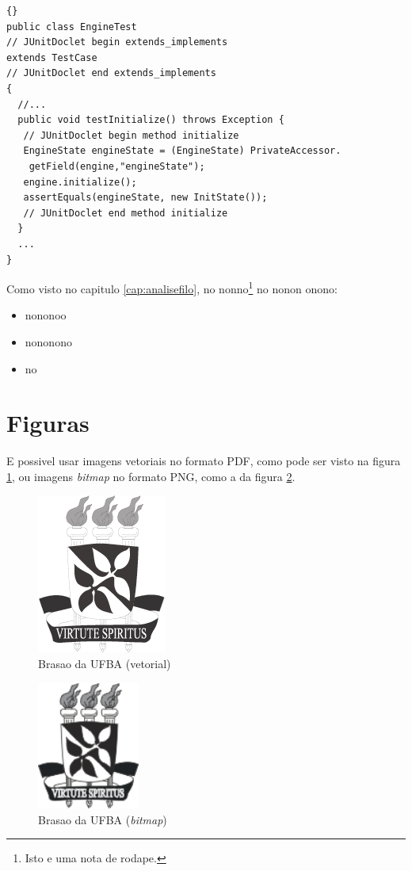 \lstset{language=java}
\lstset{commentstyle=\textit}
\begin{lstlisting}[frame=trbl, caption=Classe Factory2D,label=lst:testjUnit]{}
public class EngineTest
// JUnitDoclet begin extends_implements
extends TestCase
// JUnitDoclet end extends_implements
{
  //...
  public void testInitialize() throws Exception {
   // JUnitDoclet begin method initialize
   EngineState engineState = (EngineState) PrivateAccessor.
    getField(engine,"engineState");
   engine.initialize();
   assertEquals(engineState, new InitState());
   // JUnitDoclet end method initialize
  }
  ...
}
\end{lstlisting}

Como visto no capitulo \ref{cap:analisefilo}, no nonno\footnote{Isto e uma nota
de rodape.} no nonon onono:
\begin{itemize}
  \item{nononoo}
  \item{nononono}
  \item{no}
\end{itemize}


\section{Figuras} \label{sec:figuras}

E possivel usar imagens vetoriais no \cite{andrade2006} formato PDF, como pode ser visto
na figura \ref{fig:ufba}, ou imagens \emph{bitmap} no formato PNG, como
a da figura \ref{fig:ufba2}.

\begin{figure}
\centering
\includegraphics{brasaoUFBA2}
\caption{Brasao da UFBA (vetorial)}
\label{fig:ufba}
\end{figure}

\begin{figure}
\centering
\includegraphics[width=0.3\textwidth]{brasaoUFBA}
\caption{Brasao da UFBA (\emph{bitmap})}
\label{fig:ufba2}
\end{figure}
